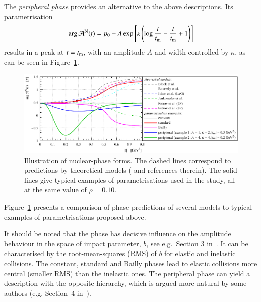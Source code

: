The {\it peripheral phase} \cite{kl94} provides an alternative to the above descriptions. Its parametrisation
\begin{equation}
\label{eq:nuc phase per}
\arg {\cal A}^{\rm N}(t) = p_0 - A \exp\left[ \kappa \left( \log {t\over t_{\rm m}} - {t\over t_{\rm m}} + 1 \right) \right]
\end{equation}
results in a peak at $t = t_{\rm m}$, with an amplitude $A$ and width controlled by $\kappa$, as can be seen in Figure~\ref{fig:phase illustration}.

\begin{figure}
\begin{center}
\includegraphics{fig/hadronic_phase_illustration.pdf}
\caption{Illustration of nuclear-phase forms. The dashed lines correspond to predictions by theoretical models (\cite{elegent} and references therein). The solid lines give typical examples of parametrisations used in the study, all at the same value of $\rho = 0.10$.
}
\label{fig:phase illustration}
\end{center}
\end{figure}

Figure~\ref{fig:phase illustration} presents a comparison of phase predictions of several models to typical examples of parametrisations proposed above.

It should be noted that the phase has decisive influence on the amplitude behaviour in the space of impact parameter, $b$, see e.g.~Section 3 in~\cite{klk02}. It can be characterised by the root-mean-squares (RMS) of $b$ for elastic and inelastic collisions. The constant, standard and Bailly phases lead to elastic collisions more central (smaller RMS) than the inelastic ones. The peripheral phase can yield a description with the opposite hierarchy, which is argued more natural by some authors (e.g. Section~4 in~\cite{kl96}).

